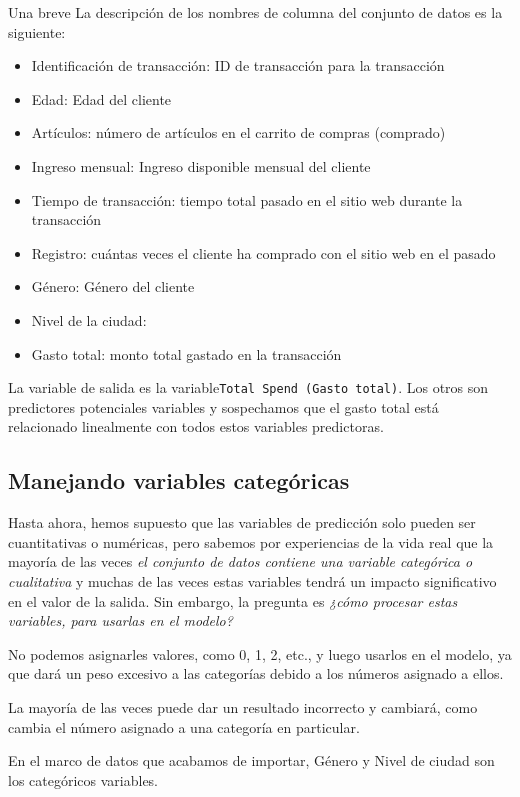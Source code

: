 Una breve
La descripción de los nombres de columna del conjunto de datos es la siguiente:
\begin{itemize}
	\item Identificación de transacción: ID de transacción para la transacción
	\item Edad: Edad del cliente
	\item Artículos: número de artículos en el carrito de compras (comprado)
	\item Ingreso mensual: Ingreso disponible mensual del cliente
	\item Tiempo de transacción: tiempo total pasado en el sitio web durante la transacción
	\item Registro: cuántas veces el cliente ha comprado con el sitio web en
	el pasado
	\item Género: Género del cliente
	\item Nivel de la ciudad: ~
	\item Gasto total: monto total gastado en la transacción
\end{itemize}



La variable de salida es la variable\texttt{Total Spend (Gasto total)}. Los otros son predictores potenciales
variables y sospechamos que el gasto total está relacionado linealmente con todos estos
variables predictoras.


\subsection{Manejando variables categóricas}

Hasta ahora, hemos supuesto que las variables de predicción solo pueden ser cuantitativas o
numéricas, pero sabemos por experiencias de la vida real que la mayoría de las veces \emph{el conjunto de datos
	contiene una variable categórica o cualitativa} y muchas de las veces estas variables
tendrá un impacto significativo en el valor de la salida. Sin embargo, la pregunta es
\emph{¿cómo procesar estas variables, para usarlas en el modelo?}


No podemos asignarles valores, como 0, 1, 2, etc., y luego usarlos en el
modelo, ya que dará un peso excesivo a las categorías debido a los números
asignado a ellos. 

La mayoría de las veces puede dar un resultado incorrecto y cambiará,
como cambia el número asignado a una categoría en particular.


En el marco de datos que acabamos de importar, Género y Nivel de ciudad son los categóricos
variables.


